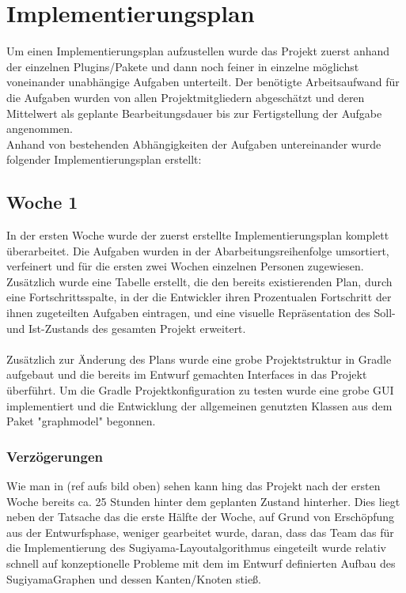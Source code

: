 \chapter{Implementierungsplan}
\label{ch:implplan}
Um einen Implementierungsplan aufzustellen wurde das Projekt zuerst anhand der einzelnen Plugins/Pakete und dann noch feiner in einzelne möglichst voneinander unabhängige Aufgaben unterteilt. Der benötigte Arbeitsaufwand für die Aufgaben wurden von allen Projektmitgliedern abgeschätzt und deren Mittelwert als geplante Bearbeitungsdauer bis zur Fertigstellung der Aufgabe angenommen.\\
Anhand von bestehenden Abhängigkeiten der Aufgaben untereinander wurde folgender Implementierungsplan erstellt:
\section{Woche 1}
In der ersten Woche wurde der zuerst erstellte Implementierungsplan komplett überarbeitet. Die Aufgaben wurden in der Abarbeitungsreihenfolge umsortiert, verfeinert und für die ersten zwei Wochen einzelnen Personen zugewiesen. Zusätzlich wurde eine Tabelle erstellt, die den bereits existierenden Plan, durch eine Fortschrittsspalte, in der die Entwickler ihren Prozentualen Fortschritt der ihnen zugeteilten Aufgaben eintragen, und eine visuelle Repräsentation des Soll- und Ist-Zustands des gesamten Projekt erweitert.\\
\\
Zusätzlich zur Änderung des Plans wurde eine grobe Projektstruktur in Gradle aufgebaut und die bereits im Entwurf gemachten Interfaces in das Projekt überführt. Um die Gradle Projektkonfiguration zu testen wurde eine grobe GUI implementiert und die Entwicklung der allgemeinen genutzten Klassen aus dem Paket "graphmodel" begonnen.


\subsection{Verzögerungen}
Wie man in (ref aufs bild oben) sehen kann hing das Projekt nach der ersten Woche bereits ca. 25 Stunden hinter dem geplanten Zustand hinterher.
Dies liegt neben der Tatsache das die erste Hälfte der Woche, auf Grund von Erschöpfung aus der Entwurfsphase, weniger gearbeitet wurde, daran, dass das Team das für die Implementierung des Sugiyama-Layoutalgorithmus eingeteilt wurde relativ schnell auf konzeptionelle Probleme mit dem im Entwurf definierten Aufbau des SugiyamaGraphen und dessen Kanten/Knoten stieß.%

